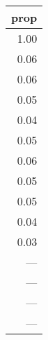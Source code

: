 \begin{tabular}{r}
  \toprule
 prop \\ 
  \midrule
  1.00 \\ 
  0.06 \\ 
  0.06 \\ 
  0.05 \\ 
  0.04 \\ 
  0.05 \\ 
  0.06 \\ 
  0.05 \\ 
  0.05 \\ 
  0.04 \\ 
  0.03 \\ 
  --- \\ 
  --- \\ 
  --- \\ 
  --- \\ 
   \bottomrule
\end{tabular}
